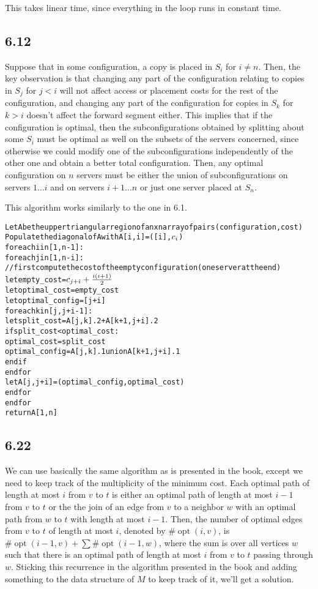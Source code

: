 \documentclass{article}
\DeclareMathOperator{\opt}{opt}
\begin{document}
This takes linear time, since everything in the loop runs in constant time.
\subsection*{6.12}
Suppose that in some configuration, a copy is placed in $S_i$ for $i\neq n$. Then, the key observation is that changing any part of the configuration relating to copies in $S_j$ for $j<i$ will not affect access or placement costs for the rest of the configuration, and changing any part of the configuration for copies in $S_k$ for $k>i$ doesn't affect the forward segment either. This implies that if the configuration is optimal, then the subconfigurations obtained by splitting about some $S_i$ must be optimal as well on the subsets of the servers concerned, since otherwise we could modify one of the subconfigurations independently of the other one and obtain a better total configuration. Then, any optimal configuration on $n$ servers must be either the union of subconfigurations on servers $1\ldots i$ and on servers $i+1\ldots n$ or just one server placed at $S_n$.

This algorithm works similarly to the one in 6.1.
\begin{alltt}
Let A be the upper triangular region of a nxn array of pairs (configuration, cost)
Populate the diagonal of A with A[i,i]=([i],\(c\sb{i}\))
for each i in [1,n-1]:
    for each j in [1,n-i]:
        //first compute the cost of the empty configuration (one server at the end)
        let empty_cost=\(c\sb{j+i}+\frac{i(i+1)}{2}\)
        let optimal_cost=empty_cost
        let optimal_config=[j+i]
        for each k in [j,j+i-1]:
            let split_cost=A[j,k].2+A[k+1,j+i].2
            if split_cost<optimal_cost:
                optimal_cost=split_cost
                optimal_config=A[j,k].1 union A[k+1,j+i].1
            endif
        endfor
        let A[j,j+i]=(optimal_config,optimal_cost)
    endfor
endfor
return A[1,n]
\end{alltt}
\subsection*{6.22}
We can use basically the same algorithm as is presented in the book, except we need to keep track of the multiplicity of the minimum cost. Each optimal path of length at most $i$ from $v$ to $t$ is either an optimal path of length at most $i-1$ from $v$ to $t$ or the the join of an edge from $v$ to a neighbor $w$ with an optimal path from $w$ to $t$ with length at most $i-1$. Then, the number of optimal edges from $v$ to $t$ of length at most $i$, denoted by $\#\opt(i,v)$, is $\#\opt(i-1,v)+\sum\#\opt(i-1,w)$, where the sum is over all vertices $w$ such that there is an optimal path of length at most $i$ from $v$ to $t$ passing through $w$. Sticking this recurrence in the algorithm presented in the book and adding something to the data structure of $M$ to keep track of it, we'll get a solution.
\end{document}
